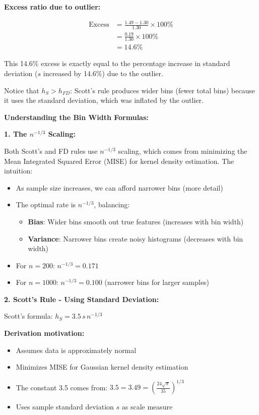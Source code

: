 \documentclass[12pt]{article}
\begin{document}
\begin{solution}
\textbf{Excess ratio due to outlier:}

\begin{align*}
\text{Excess} &= \frac{1.49 - 1.30}{1.30} \times100\% \\
&= \frac{0.19}{1.30} \times 100\% \\
&= 14.6\%
\end{align*}

This 14.6\% excess is exactly equal to the percentage increase in standard deviation (\(s\) increased by 14.6\%) due to the outlier.

Notice that \(h_S > h_{FD}\): Scott's rule produces wider bins (fewer total bins) because it uses the standard deviation, which was inflated by the outlier.
\end{solution}


\begin{explanation}
\textbf{Understanding the Bin Width Formulas:}

\textbf{1. The \(n^{-1/3}\) Scaling:}

Both Scott's and FD rules use \(n^{-1/3}\) scaling, which comes from minimizing the Mean Integrated Squared Error (MISE) for kernel density estimation. The intuition:

\begin{itemize}
    \item As sample size increases, we can afford narrower bins (more detail)
    \item The optimal rate is \(n^{-1/3}\), balancing:
    \begin{itemize}
        \item \textbf{Bias}: Wider bins smooth out true features (increases with bin width)
        \item \textbf{Variance}: Narrower bins create noisy histograms (decreases with bin width)
    \end{itemize}
    \item For \(n = 200\): \(n^{-1/3} = 0.171\)
    \item For \(n = 1000\): \(n^{-1/3} = 0.100\) (narrower bins for larger samples)
\end{itemize}

\textbf{2. Scott's Rule - Using Standard Deviation:}

Scott's formula: \(h_S = 3.5\,s\,n^{-1/3}\)

\textbf{Derivation motivation:}
\begin{itemize}
    \item Assumes data is approximately normal
    \item Minimizes MISE for Gaussian kernel density estimation
    \item The constant 3.5 comes from: \(3.5 = 3.49 = \left(\frac{24\sqrt{\pi}}{35}\right)^{1/3}\)
    \item Uses sample standard deviation \(s\) as scale measure
\end{itemize}


\end{explanation}
\end{document}
